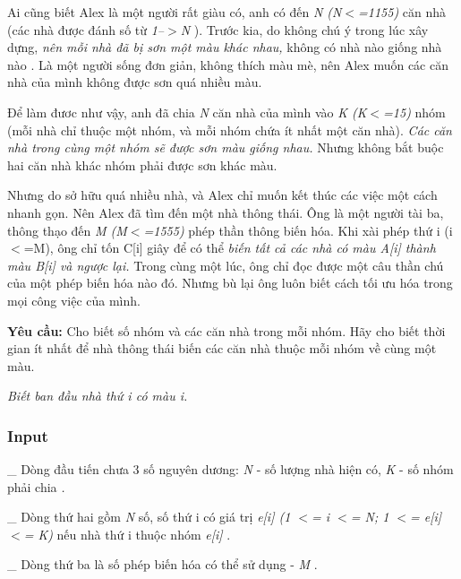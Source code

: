 



   Ai cũng biết Alex là một người rất giàu có, anh có đến   \emph{    N (N$<$=1155)   }   căn nhà (các nhà được đánh số từ   \emph{    1--$>$N   }   ). Trước kia, do không chú ý trong lúc xây dựng,   \emph{    nên mỗi nhà đã bị sơn một màu khác nhau,   }   không có nhà nào giống nhà nào . Là một người sống đơn giản, không thích màu mè, nên Alex muốn các căn nhà của mình không được sơn quá nhiều màu.  

   Để làm đươc như vậy, anh đã chia   \emph{    N   }   căn nhà của mình vào   \textbf{\emph{}}\emph{    K (K$<$=15)   }   nhóm (mỗi nhà chỉ thuộc một nhóm, và mỗi nhóm chứa ít nhất một căn nhà).   \emph{    Các căn nhà trong cùng một nhóm sẽ được sơn màu giống nhau.   }   Nhưng không bắt buộc hai căn nhà khác nhóm phải được sơn khác màu.   \emph{
\\}

   Nhưng do sở hữu quá nhiều nhà, và Alex chỉ muốn kết thúc các việc một cách nhanh gọn. Nên Alex đã tìm đến một nhà thông thái. Ông là một người tài ba, thông thạo đến   \emph{    M (M$<$=1555)   }   phép thần thông biến hóa. Khi xài phép thứ i (i$<$=M), ông chỉ tốn C[i] giây để có thể   \emph{    biến tất cả các nhà có màu A[i] thành màu B[i] và ngược lại.   }   Trong cùng một lúc, ông chỉ đọc được một câu thần chú của một phép biến hóa nào đó.   \emph{}   Nhưng bù lại ông luôn biết cách tối ưu hóa trong mọi công việc của mình.   \emph{
\\}

\textbf{    Yêu cầu:   }   Cho biết số nhóm và các căn nhà trong mỗi nhóm. Hãy cho biết thời gian ít nhất để nhà thông thái biến các căn nhà thuộc mỗi nhóm về cùng một màu.  

\emph{    Biết ban đầu nhà thứ i có màu i.    
\\}

\subsubsection{   Input  }

   \_ Dòng đầu tiến chưa 3 số nguyên dương:   \emph{    N   }   - số lượng nhà hiện có,   \emph{    K   }   - số nhóm phải chia   \emph{    .   }

   \_ Dòng thứ hai gồm   \emph{    N   }   số, số thứ i có giá trị   \emph{    e[i] (1 $<$= i $<$= N; 1 $<$= e[i] $<$= K)   }   nếu nhà thứ i thuộc nhóm   \emph{    e[i]   }   .  

   \_ Dòng thứ ba là số phép biến hóa có thể sử dụng -   \emph{    M   }   .  

